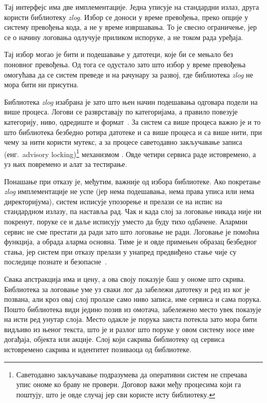 \documentclass[12pt,oneside]{memoir}
\begin{document}
Тај интерфејс има две имплементације. Једна уписује на стандардни излаз, друга користи
библиотеку \emph{zlog}. Избор се доноси у време превођења, преко опције 
у систему превођења кода, а не у време извршавања. То је свесно ограничење, јер се о начину
логовања одлучује приликом испоруке, а не током рада уређаја.

Тај избор могао је бити и подешавање у датотеци, које би се мењало без поновног превођења.
Од тога се одустало зато што избор у време превођења омогућава да се систем преведе и на
рачунару за развој, где библиотека \emph{zlog} не мора бити ни присутна.

Библиотека \emph{zlog} изабрана је зато што њен начин подешавања одговара подели на више процеса.
Логови се разврставају по категоријама, а правило повезује категорију, ниво, одредиште и
формат~\cite{ZlogGuide}. За систем са више процеса важно је и то што библиотека безбедно
ротира датотеке и са више процеса и са више нити, при чему за нити користи мутекс, а за
процесе саветодавно закључавање записа (енг.\ advisory locking)\footnote{Саветодавно
 закључавање подразумева да оперативни систем не спречава упис ономе ко браву не провери. Договор важи међу процесима који га
  поштују, што је овде случај јер сви користе исту библиотеку.} механизмом .
   Овде четири сервиса раде истовремено, а уз њих повремено и алат за тестирање.

Понашање при отказу је, међутим, важније од избора библиотеке. Ако покретање \emph{zlog}
имплементације не успе (јер нема подешавања, нема права уписа или нема директоријума),
систем исписује упозорење и прелази се на испис на стандардном излазу, па наставља рад. Чак
и када слој за
логовање никада није ни покренут, поруке се и даље исписују уместо да буду тихо
одбачене. Алармни сервис не сме престати да ради зато што логовање не ради. Логовање
је помоћна функција, а обрада аларма основна. Тиме је и овде примењен образац безбедног
стања, јер систем при отказу прелази у унапред предвиђено стање чије су последице познате и
безопасне~\cite{Armoush2010}.

Свака апстракција има и цену, а ова своју показује баш у ономе што скрива. Библиотека за
логовање уме уз сваки лог да забележи датотеку и ред из ког је позвана, али кроз овај слој
пролазе само ниво записа, име сервиса и сама порука. Пошто библиотека види једино позив из
омотача, забележено место увек показује на исти ред унутар слоја. Место одакле је порука заиста
потекла зато мора бити видљиво из њеног текста, што је и разлог што поруке у овом систему носе
име догађаја, објекта или акције. Слој који сакрива библиотеку од сервиса истовремено сакрива и
идентитет позиваоца од библиотеке.
\end{document}
